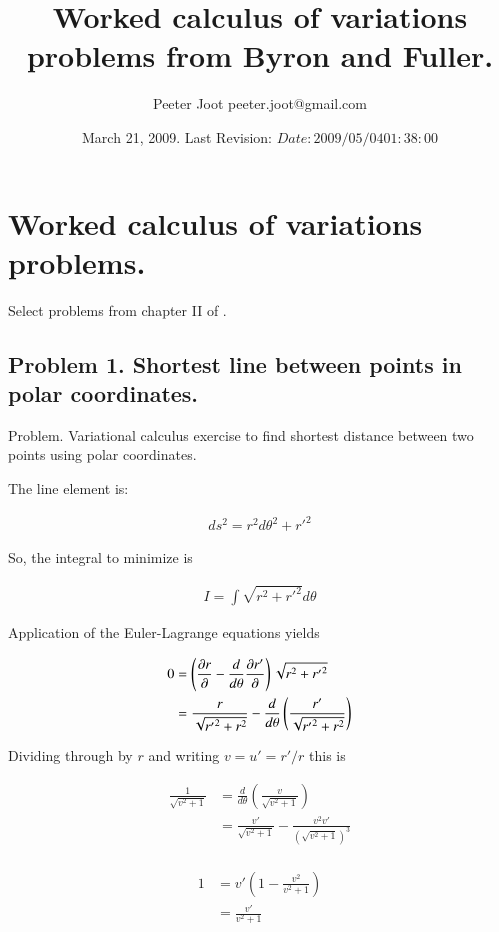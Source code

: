 \documentclass{article}
\title{ Worked calculus of variations problems from Byron and Fuller. }
\author{Peeter Joot \quad peeter.joot@gmail.com }
\date{ March 21, 2009.  Last Revision: $Date: 2009/05/04 01:38:00 $ }
\begin{document}
\maketitle{}
\tableofcontents

\section{ Worked calculus of variations problems. }

Select problems from chapter II of \cite{byron1992mca}.

\subsection{ Problem 1.  Shortest line between points in polar coordinates. }

Problem.  Variational calculus exercise to find shortest distance between two points using polar coordinates.
 
The line element is:
 
\begin{align*}
ds^2 = r^2 d\theta^2 + {r'}^2
\end{align*}
 
So, the integral to minimize is
 
\begin{align*}
I = \int \sqrt{ r^2 + {r'}^2 } d\theta
\end{align*}
 
Application of the Euler-Lagrange equations yields
 
\begin{align*}
0 
&= \left( \frac{\partial{r}}{\partial {}} - \frac{d}{d\theta} \frac{\partial{r'}}{\partial {}} \right) \sqrt{ r^2 + {r'}^2 }  \\
&= \frac{r}{\sqrt{{r'}^2 + r^2}} - \frac{d}{d\theta} \left( \frac{{r'}}{\sqrt{{r'}^2 + r^2}}\right) \\
\end{align*}
 
Dividing through by $r$ and writing $v = u' = {r'}/r$ this is
 
\begin{align*}
\frac{1}{\sqrt{v^2 + 1}}
&= \frac{d}{d\theta} \left( \frac{v}{\sqrt{v^2 + 1}}\right) \\
&= \frac{v'}{\sqrt{v^2 + 1}} -\frac{v^2 v'}{(\sqrt{v^2 + 1})^3} \\
\end{align*}
 
\begin{align*}
1 
&= v' \left( 1 -\frac{v^2 }{v^2 + 1} \right) \\
&= \frac{v'}{v^2 + 1} \\
\end{align*}
\end{document}
